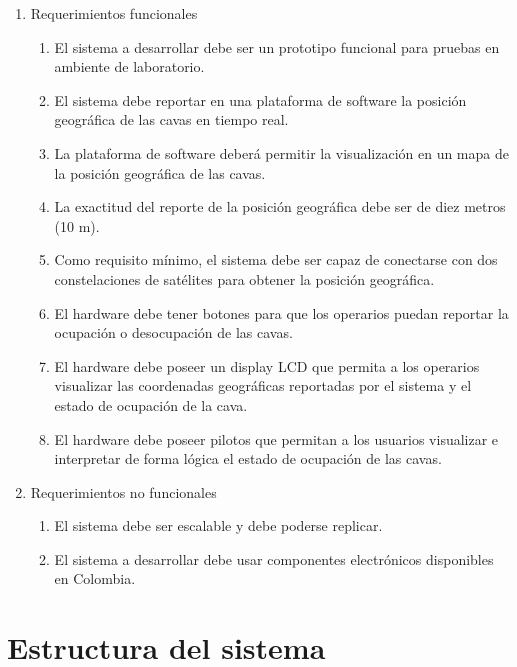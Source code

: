 \begin{enumerate}
	\item Requerimientos funcionales
		\begin{enumerate}
            \item El sistema a desarrollar debe ser un prototipo funcional para pruebas en ambiente de laboratorio. 
			\item El sistema debe reportar en una plataforma de software la posición geográfica de las cavas en tiempo real.
            \item La plataforma de software deberá permitir la visualización en un mapa de la posición geográfica de las cavas.
			\item La exactitud del reporte de la posición geográfica debe ser de diez metros (10 m). 
            \item Como requisito mínimo, el sistema debe ser capaz de conectarse con dos constelaciones de satélites para obtener la posición geográfica.  
            \item El hardware debe tener botones para que los operarios puedan reportar la ocupación o desocupación de las cavas. 
            \item El hardware debe poseer un display LCD que permita a los operarios visualizar las coordenadas geográficas reportadas por el sistema y el estado de ocupación de la cava. 
            \item El hardware debe poseer pilotos que permitan a los usuarios visualizar e interpretar de forma lógica el estado de ocupación de las cavas. 
		\end{enumerate}
	\item Requerimientos no funcionales
		\begin{enumerate}
			\item El sistema debe ser escalable y debe poderse replicar. 
			\item El sistema a desarrollar debe usar componentes electrónicos disponibles en Colombia. 
		\end{enumerate}
\end{enumerate}






\section{Estructura del sistema}
\label{sec:Estructura_sistema}

